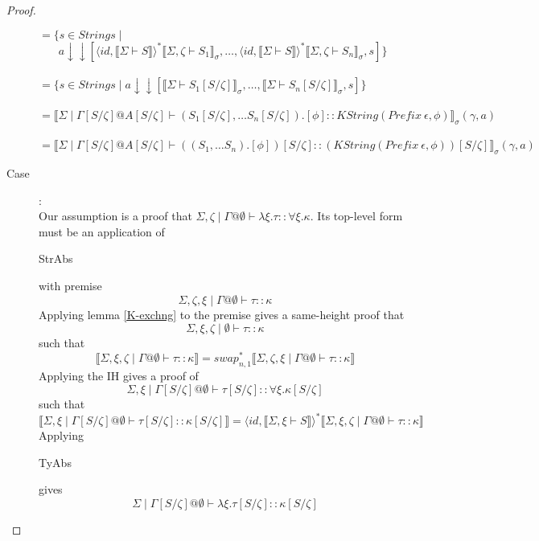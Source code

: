 \documentclass{article}
\newcommand{\sem}[1]{\llbracket #1 \rrbracket}
\begin{document}
\begin{proof}
\begin{description}
$= \{ s \in \mathit{Strings} \mid$ \\
$~~~~~~~~a \downarrow \downarrow [\langle \mathit{id}, \sem{\Sigma \vdash S} \rangle^*\sem{\Sigma,\zeta \vdash S_1}_\sigma, \ldots, \langle \mathit{id}, \sem{\Sigma \vdash S} \rangle^*\sem{\Sigma,\zeta \vdash S_n}_\sigma, s]\}$\\~\\
$= \{ s \in \mathit{Strings} \mid a \downarrow \downarrow [\sem{\Sigma \vdash S_1[S/\zeta]}_\sigma, \ldots, \sem{\Sigma \vdash S_n[S/\zeta]}_\sigma, s] \}$\\~\\
$= \sem{\Sigma \mid \Gamma[S/\zeta] @ A[S/\zeta] \vdash (S_1[S/\zeta], \ldots S_n[S/\zeta]).[\phi] :: \mathit{KString}(\mathit{Prefix}~\epsilon,\phi)}_{\sigma}(\gamma, a)$\\~\\
$= \sem{\Sigma \mid \Gamma[S/\zeta] @ A[S/\zeta] \vdash ((S_1, \ldots S_n).[\phi])[S/\zeta] :: (\mathit{KString}(\mathit{Prefix}~\epsilon,\phi))[S/\zeta]}_\sigma(\gamma,a)$

\item[Case \begin{sc}StrAbs\end{sc}]:~\\
Our assumption is a proof that $\Sigma,\zeta \mid \Gamma @ \emptyset \vdash \lambda \xi. \tau :: \forall \xi. \kappa$. Its top-level form must be an application of \begin{sc}StrAbs\end{sc} with premise $$\Sigma,\zeta,\xi \mid \Gamma @ \emptyset \vdash \tau :: \kappa$$ Applying lemma \ref{K-exchng} to the premise gives a same-height proof that $$\Sigma,\xi,\zeta \mid \emptyset \vdash \tau :: \kappa$$ such that $$\sem{\Sigma,\xi,\zeta \mid \Gamma @ \emptyset \vdash \tau :: \kappa} = \mathit{swap}_{n,1}^*\sem{\Sigma,\zeta,\xi \mid \Gamma @ \emptyset \vdash \tau :: \kappa}$$ Applying the IH gives a proof of $$\Sigma,\xi \mid \Gamma[S/\zeta] @ \emptyset \vdash \tau[S/\zeta] :: \forall \xi. \kappa[S/\zeta]$$ such that $$\sem{\Sigma,\xi \mid \Gamma[S/\zeta] @ \emptyset \vdash \tau[S/\zeta] :: \kappa[S/\zeta]} = \langle \mathit{id}, \sem{\Sigma,\xi \vdash S} \rangle^* \sem{\Sigma,\xi,\zeta \mid \Gamma @ \emptyset \vdash \tau :: \kappa}$$ Applying \begin{sc}TyAbs\end{sc} gives $$\Sigma \mid \Gamma[S/\zeta] @ \emptyset \vdash \lambda \xi. \tau[S/\zeta] :: \kappa[S/\zeta]$$  


\end{description}
\end{proof}
\end{document}
